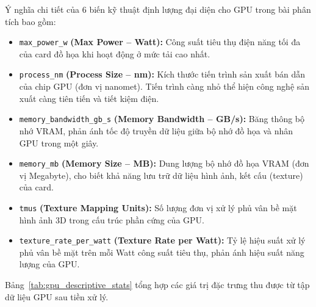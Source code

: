 Ý nghĩa chi tiết của 6 biến kỹ thuật định lượng đại diện cho GPU trong bài phân tích bao gồm:
\begin{itemize}\tightlist
    \item \texttt{max\_power\_w} \textbf{(Max Power -- Watt):} Công suất tiêu thụ điện năng tối đa của card đồ họa khi hoạt động ở mức tải cao nhất.
    \item \texttt{process\_nm} \textbf{(Process Size -- nm):} Kích thước tiến trình sản xuất bán dẫn của chip GPU (đơn vị nanomet). Tiến trình càng nhỏ thể hiện công nghệ sản xuất càng tiên tiến và tiết kiệm điện.
    \item \texttt{memory\_bandwidth\_gb\_s} \textbf{(Memory Bandwidth -- GB/s):} Băng thông bộ nhớ VRAM, phản ánh tốc độ truyền dữ liệu giữa bộ nhớ đồ họa và nhân GPU trong một giây.
    \item \texttt{memory\_mb} \textbf{(Memory Size -- MB):} Dung lượng bộ nhớ đồ họa VRAM (đơn vị Megabyte), cho biết khả năng lưu trữ dữ liệu hình ảnh, kết cấu (texture) của card.
    \item \texttt{tmus} \textbf{(Texture Mapping Units):} Số lượng đơn vị xử lý phủ vân bề mặt hình ảnh 3D trong cấu trúc phần cứng của GPU.
    \item \texttt{texture\_rate\_per\_watt} \textbf{(Texture Rate per Watt):} Tỷ lệ hiệu suất xử lý phủ vân bề mặt trên mỗi Watt công suất tiêu thụ, phản ánh hiệu suất năng lượng của GPU.
\end{itemize}

Bảng~\ref{tab:gpu_descriptive_stats} tổng hợp các giá trị đặc trưng thu được từ tập dữ liệu GPU sau tiền xử lý.

